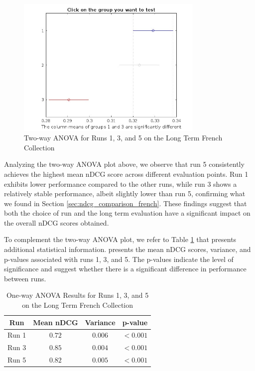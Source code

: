 \begin{figure}[!h]
\centering
\includegraphics[width=0.8\textwidth]{figure/StatisticalAnalysis/AnovaTwoWay/LT_FR.jpg}
\caption{Two-way \ac{ANOVA} for Runs 1, 3, and 5 on the Long Term French Collection}
\label{fig:lt_anova_french}
\end{figure}

Analyzing the two-way \ac{ANOVA} plot above, we observe that run 5 consistently achieves the highest mean \ac{nDCG} score across different evaluation points. 
Run 1 exhibits lower performance compared to the other runs, while run 3 shows a relatively stable performance, albeit slightly lower than run 5, confirming what we found in Section \ref{sec:ndcg_comparison_french}.
These findings suggest that both the choice of run and the long term evaluation have a significant impact on the overall \ac{nDCG} scores obtained.

To complement the two-way \ac{ANOVA} plot, we refer to Table \ref{table:lt_anova_french} that presents additional statistical information.
presents the mean \ac{nDCG} scores, variance, and p-values associated with runs 1, 3, and 5. 
The p-values indicate the level of significance and suggest whether there is a significant difference in performance between runs.

\begin{table}[!h]
\centering
\caption{One-way \ac{ANOVA} Results for Runs 1, 3, and 5 on the Long Term French Collection}
\label{table:lt_anova_french}
\begin{tabular}{cccc}
\toprule
\textbf{Run} & \textbf{Mean nDCG} & \textbf{Variance} & \textbf{p-value} \\
\midrule
Run 1 & $0.72$ & $0.006$ & $<0.001$ \\
Run 3 & $0.85$ & $0.004$ & $<0.001$ \\
Run 5 & $0.82$ & $0.005$ & $<0.001$ \\
\bottomrule
\end{tabular}
\end{table}

